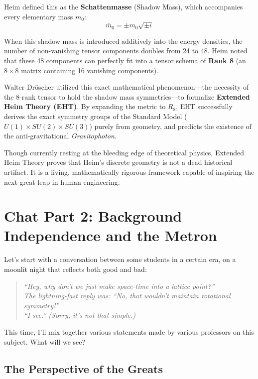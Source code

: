 \documentclass[11pt,a4paper,oneside]{article}
\newenvironment{fancyquote}
    {\begin{quote}\itshape\color{theoryblue!80!black}\guillemotleft\;}
    {\;\guillemotright\end{quote}}
\begin{document}
Heim defined this as the \textbf{Schattenmasse} (Shadow Mass), which accompanies every elementary mass $m_0$:
\begin{equation}
    \overline{m}_0 = \pm m_0 \sqrt{\pm i}
\end{equation}

When this shadow mass is introduced additively into the energy densities, the number of non-vanishing tensor components doubles from 24 to 48. Heim noted that these 48 components can perfectly fit into a tensor schema of \textbf{Rank 8} (an $8 \times 8$ matrix containing 16 vanishing components). 

Walter Dröscher utilized this exact mathematical phenomenon—the necessity of the 8-rank tensor to hold the shadow mass symmetries—to formalize \textbf{Extended Heim Theory (EHT)}. By expanding the metric to $R_8$, EHT successfully derives the exact symmetry groups of the Standard Model ($U(1) \times SU(2) \times SU(3)$) purely from geometry, and predicts the existence of the anti-gravitational \textit{Gravitophoton}.

Though currently resting at the bleeding edge of theoretical physics, Extended Heim Theory proves that Heim's discrete geometry is not a dead historical artifact. It is a living, mathematically rigorous framework capable of inspiring the next great leap in human engineering.

\section{Chat Part 2: Background Independence and the Metron}

Let's start with a conversation between some students in a certain era, on a moonlit night that reflects both good and bad:

\begin{fancyquote}
    ``Hey, why don't we just make space-time into a lattice point?''\\
    The lightning-fast reply was: ``No, that wouldn't maintain rotational symmetry!''\\
    ``I see.'' (Sorry, it's not that simple.)
\end{fancyquote}

This time, I'll mix together various statements made by various professors on this subject. What will we see?

\subsection{The Perspective of the Greats}
\end{document}
